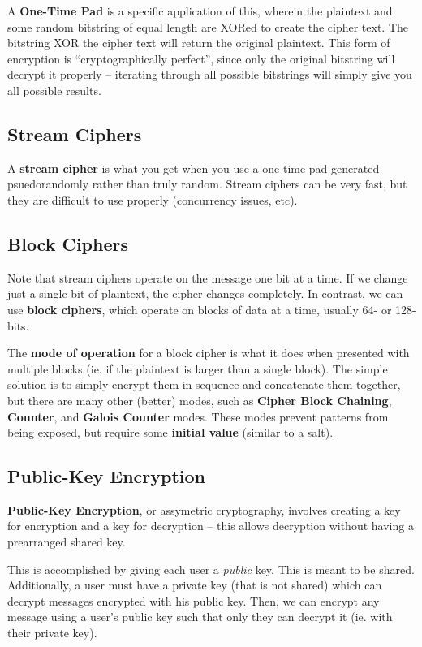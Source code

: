 \documentclass[12pt]{article}
\begin{document}
A {\bf One-Time Pad} is a specific application of this, wherein the plaintext and some random bitstring of equal length are XORed to create the cipher text. The bitstring XOR the cipher text will return the original plaintext. This form of encryption is ``cryptographically perfect'', since only the original bitstring will decrypt it properly -- iterating through all possible bitstrings will simply give you all possible results.

\subsection{Stream Ciphers}
A {\bf stream cipher} is what you get when you use a one-time pad generated psuedorandomly rather than truly random. Stream ciphers can be very fast, but they are difficult to use properly (concurrency issues, etc).

\subsection{Block Ciphers}
Note that stream ciphers operate on the message one bit at a time. If we change just a single bit of plaintext, the cipher changes completely. In contrast, we can use {\bf block ciphers}, which operate on blocks of data at a time, usually 64- or 128-bits.

The {\bf mode of operation} for a block cipher is what it does when presented with multiple blocks (ie. if the plaintext is larger than a single block). The simple solution is to simply encrypt them in sequence and concatenate them together, but there are many other (better) modes, such as {\bf Cipher Block Chaining}, {\bf Counter}, and {\bf Galois Counter} modes. These modes prevent patterns from being exposed, but require some {\bf initial value} (similar to a salt).

\subsection{Public-Key Encryption}
{\bf Public-Key Encryption}, or assymetric cryptography, involves creating a key for encryption and a key for decryption -- this allows decryption without having a prearranged shared key.

This is accomplished by giving each user a \emph{public} key. This is meant to be shared. Additionally, a user must have a private key (that is not shared) which can decrypt messages encrypted with his public key. Then, we can encrypt any message using a user's public key such that only they can decrypt it (ie. with their private key).
\end{document}
